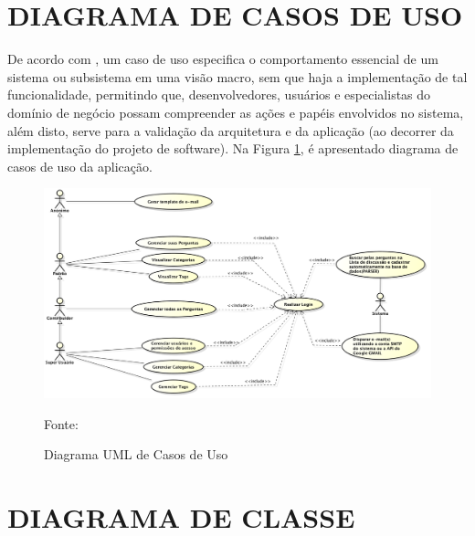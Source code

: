 \section{DIAGRAMA DE CASOS DE USO}

De acordo com , um caso de uso especifica o
comportamento essencial de um sistema ou subsistema em uma visão macro, sem que
haja a implementação de tal funcionalidade, permitindo que, desenvolvedores, 
usuários e especialistas do domínio de negócio possam compreender as ações e 
papéis envolvidos no sistema, além disto, serve para a validação da arquitetura 
e da aplicação (ao decorrer da implementação do projeto de software). Na Figura
\ref{fig:diagramaCasosDeUso}, é apresentado diagrama de casos de uso da aplicação.

\begin{figure}[h!tb]
	\caption{Diagrama UML de Casos de Uso}
	\label{fig:diagramaCasosDeUso}

	\centering
	\includegraphics[width=\textwidth]{images/usecase.png}

	\centering
	\footnotesize Fonte: \fonteOAutor
\end{figure}

\FloatBarrier 	%

\section{DIAGRAMA DE CLASSE}

